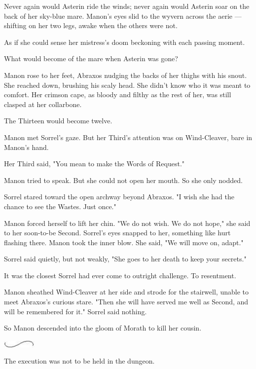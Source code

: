 Never again would Asterin ride the winds; never again would Asterin soar on the back of her sky-blue mare.
Manon's eyes slid to the wyvern across the aerie ---shifting on her two legs, awake when the others were not.

As if she could sense her mistress's doom beckoning with each passing moment.

What would become of the mare when Asterin was gone?

Manon rose to her feet, Abraxos nudging the backs of her thighs with his snout.
She reached down, brushing his scaly head.
She didn't know who it was meant to comfort.
Her crimson cape, as bloody and filthy as the rest of her, was still clasped at her collarbone.

The Thirteen would become twelve.

Manon met Sorrel's gaze.
But her Third's attention was on Wind-Cleaver, bare in Manon's hand.

Her Third said, "You mean to make the Words of Request."

Manon tried to speak.
But she could not open her mouth.
So she only nodded.

Sorrel stared toward the open archway beyond Abraxos.
"I wish she had the chance to see the Wastes.
Just once."

Manon forced herself to lift her chin.
"We do not wish.
We do not hope," she said to her soon-to-be Second.
Sorrel's eyes snapped to her, something like hurt flashing there.
Manon took the inner blow.
She said, "We will move on, adapt."

Sorrel said quietly, but not weakly, "She goes to her death to keep your secrets."

It was the closest Sorrel had ever come to outright challenge.
To resentment.

Manon sheathed Wind-Cleaver at her side and strode for the stairwell, unable to meet Abraxos's curious stare.
"Then she will have served me well as Second, and will be remembered for it."
Sorrel said nothing.

So Manon descended into the gloom of Morath to kill her cousin.

\begin{center}
	\includegraphics[width=0.65in,height=0.13in]{images/seperator}
\end{center}

The execution was not to be held in the dungeon.

